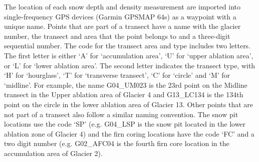 \documentclass{sfuthesis}
\begin{document}
\begin{appendices}
The location of each snow depth and density measurement are imported into single-frequency GPS devices (Garmin GPSMAP 64s) as a waypoint with a unique name. Points that are part of a transect have a name with the glacier number, the transect and area that the point belongs to and a three-digit sequential number. The code for the transect area and type includes two letters. The first letter is either `A' for `accumulation area', `U' for `upper ablation area', or `L' for `lower ablation area'. The second letter indicates the transect type, with `H' for `hourglass', `T' for `transverse transect', `C' for `circle' and `M' for `midline'. For example, the name G04\_UM023 is the 23rd point on the Midline transect in the Upper ablation area of Glacier 4 and G13\_LC134 is the 134th point on the circle in the lower ablation area of Glacier 13. Other points that are not part of a transect also follow a similar naming convention. The snow pit locations use the code `SP' (e.g. G04\_LSP is the snow pit located in the lower ablation zone of Glacier 4) and the firn coring locations have the code `FC' and a two digit number (e.g. G02\_AFC04 is the fourth firn core location in the accumulation area of Glacier 2).
	

\end{appendices}
\end{document}
